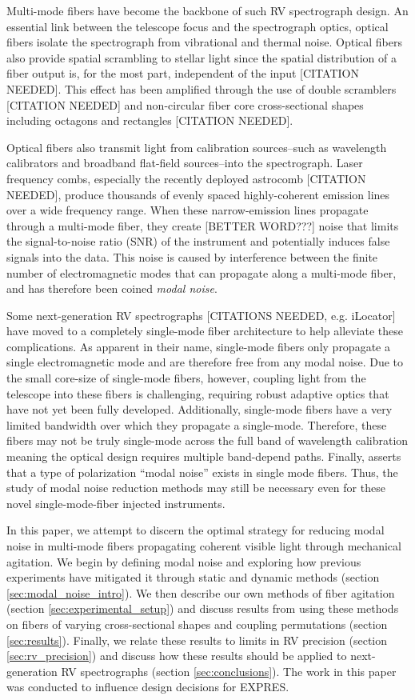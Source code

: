\documentclass[twocolumn]{emulateapj}
\begin{document}
Multi-mode fibers have become the backbone of such RV spectrograph design. An essential link between the telescope focus and the spectrograph optics, optical fibers isolate the spectrograph from vibrational and thermal noise. Optical fibers also provide spatial scrambling to stellar light since the spatial distribution of a fiber output is, for the most part, independent of the input [CITATION NEEDED]. This effect has been amplified through the use of double scramblers [CITATION NEEDED] and non-circular fiber core cross-sectional shapes including octagons and rectangles [CITATION NEEDED].

Optical fibers also transmit light from calibration sources--such as wavelength calibrators and broadband flat-field sources--into the spectrograph. Laser frequency combs, especially the recently deployed astrocomb [CITATION NEEDED],  produce thousands of evenly spaced highly-coherent emission lines over a wide frequency range. When these narrow-emission lines propagate through a multi-mode fiber, they create [BETTER WORD???] noise that limits the signal-to-noise ratio (SNR) of the instrument and potentially induces false signals into the data. This noise is caused by interference between the finite number of electromagnetic modes that can propagate along a multi-mode fiber, and has therefore been coined \textit{modal noise}.

Some next-generation RV spectrographs [CITATIONS NEEDED, e.g. iLocator] have moved to a completely single-mode fiber architecture to help alleviate these complications. As apparent in their name, single-mode fibers only propagate a single electromagnetic mode and are therefore free from any modal noise. Due to the small core-size of single-mode fibers, however, coupling light from the telescope into these fibers is challenging, requiring robust adaptive optics that have not yet been fully developed. Additionally, single-mode fibers have a very limited bandwidth over which they propagate a single-mode. Therefore, these fibers may not be truly single-mode across the full band of wavelength calibration meaning the optical design requires multiple band-depend paths. Finally, \cite{Halverson2015b} asserts that a type of polarization ``modal noise'' exists in single mode fibers. Thus, the study of modal noise reduction methods may still be necessary even for these novel single-mode-fiber injected instruments.

In this paper, we attempt to discern the optimal strategy for reducing modal noise in multi-mode fibers propagating coherent visible light through mechanical agitation. We begin by defining modal noise and exploring how previous experiments have mitigated it through static and dynamic methods (section \ref{sec:modal_noise_intro}). We then describe our own methods of fiber agitation (section \ref{sec:experimental_setup}) and discuss results from using these methods on fibers of varying cross-sectional shapes and coupling permutations (section \ref{sec:results}). Finally, we relate these results to limits in RV precision (section \ref{sec:rv_precision}) and discuss how these results should be applied to next-generation RV spectrographs (section \ref{sec:conclusions}). The work in this paper was conducted to influence design decisions for EXPRES.
\end{document}
